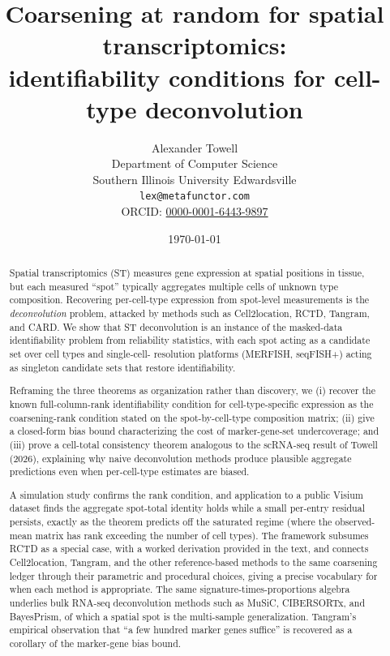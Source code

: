 \documentclass[11pt,letterpaper]{article}
\title{Coarsening at random for spatial transcriptomics:\\
       identifiability conditions for cell-type deconvolution}
\author{
  Alexander Towell \\
  Department of Computer Science \\
  Southern Illinois University Edwardsville \\
  \texttt{lex@metafunctor.com} \\
  ORCID: \href{https://orcid.org/0000-0001-6443-9897}{0000-0001-6443-9897}
}
\date{\today}
\theoremstyle{plain}
\theoremstyle{definition}
\theoremstyle{remark}
\newcommand{\1}{\mathbf{1}}
\begin{document}
\maketitle

\begin{abstract}
Spatial transcriptomics (ST) measures gene expression at spatial
positions in tissue, but each measured ``spot'' typically aggregates
multiple cells of unknown type composition. Recovering per-cell-type
expression from spot-level measurements is the \emph{deconvolution}
problem, attacked by methods such as Cell2location, RCTD, Tangram,
and CARD. We show that ST deconvolution is an instance of the
masked-data identifiability problem from reliability statistics, with
each spot acting as a candidate set over cell types and single-cell-
resolution platforms (MERFISH, seqFISH+) acting as singleton
candidate sets that restore identifiability.

Reframing the three theorems as organization rather than discovery, we
(i) recover the known full-column-rank identifiability condition for
cell-type-specific expression as the coarsening-rank condition stated
on the spot-by-cell-type composition matrix; (ii) give a closed-form
bias bound characterizing the cost of marker-gene-set undercoverage;
and (iii) prove a cell-total consistency theorem analogous to the
scRNA-seq result of Towell (2026), explaining why naive deconvolution
methods produce plausible aggregate predictions even when per-cell-type
estimates are biased.

A simulation study confirms the rank condition, and application to a
public Visium dataset finds the aggregate spot-total identity holds
while a small per-entry residual persists, exactly as the theorem
predicts off the saturated regime (where the observed-mean matrix has
rank exceeding the number of cell types). The framework subsumes RCTD
as a special case, with a worked derivation provided in the text, and
connects Cell2location, Tangram, and the other reference-based methods
to the same coarsening ledger through their parametric and procedural
choices, giving a precise vocabulary for when each method is
appropriate. The same signature-times-proportions algebra underlies
bulk RNA-seq deconvolution methods such as MuSiC, CIBERSORTx, and
BayesPrism, of which a spatial spot is the multi-sample generalization.
Tangram's empirical observation that ``a few hundred marker genes
suffice'' is recovered as a corollary of the marker-gene bias bound.
\end{abstract}












\end{document}
